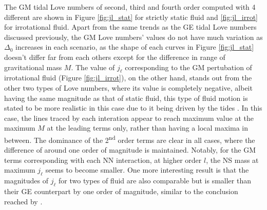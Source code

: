 The \gls{GM} tidal Love numbers of second, third and fourth order computed with 4 different  are shown in Figure \ref{fig:jl_stat} for strictly static fluid and \ref{fig:jl_irrot} for irrotational fluid. Apart from the same trends as the \gls{GE} tidal Love numbers discussed previously, the \gls{GM} Love numbers' values do not have much variation as $\Delta_0$ increases in each scenario, as the shape of each curves in Figure \ref{fig:jl_stat} doesn't differ far from each others except for the difference in range of gravitational mass $M$. The value of $j_\ell$ corresponding to the \gls{GM} pertubation of irrotational fluid (Figure \ref{fig:jl_irrot}), on the other hand, stands out from the other two types of Love numbers, where its value is completely negative, albeit having the same magnitude as that of static fluid, this type of fluid motion is stated to be more realistic in this case due to it being driven by the tides \citep{perot2021role,pani2018magnetic}. In this case, the lines traced by each interation appear to reach maximum value at the maximum $M$ at the leading terms only, rather than having a local maxima in between. The dominance of the 2\textsuperscript{nd} order terms are clear in all cases, where the difference of around one order of magnitude is maintained. Notably, for the \gls{GM} terms corresponding with each \gls{NN} interaction, at higher order $l$, the \gls{NS} mass at maximum $j_\ell$ seems to become smaller. One more interesting result is that the magnitudes of $j_\ell$ for two types of fluid are also comparable but is smaller than their \gls{GE} counterpart by one order of magnitude, similar to the conclusion reached by \cite{perot2021role}.
